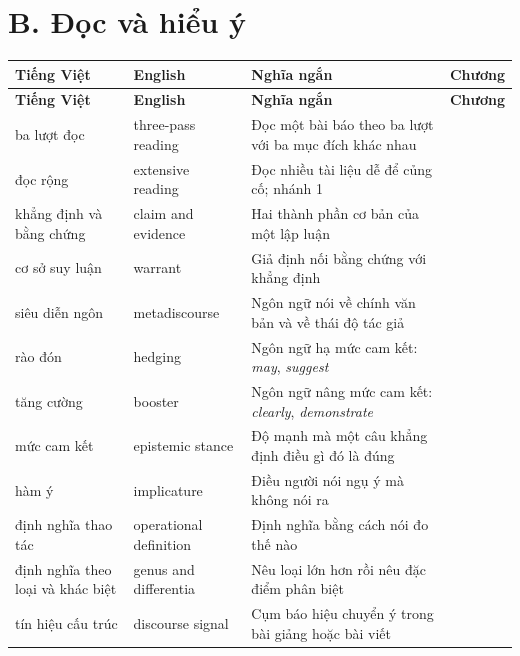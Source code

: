 \documentclass[english.tex]{subfiles}
\begin{document}
\section*{B. Đọc và hiểu ý}
\begin{center}\footnotesize
{}
\begin{longtable}{@{}L{3.4cm}L{3.8cm}L{6.6cm}L{1.5cm}@{}}
\toprule
\textbf{Tiếng Việt} & \textbf{English} & \textbf{Nghĩa ngắn} & \textbf{Chương}\\
\midrule
\endfirsthead
\toprule
\textbf{Tiếng Việt} & \textbf{English} & \textbf{Nghĩa ngắn} & \textbf{Chương}\\
\midrule
\endhead
ba lượt đọc & three-pass reading & Đọc một bài báo theo ba lượt với ba mục đích khác nhau & \\
đọc rộng & extensive reading & Đọc nhiều tài liệu dễ để củng cố; nhánh 1 & \\
khẳng định và bằng chứng & claim and evidence & Hai thành phần cơ bản của một lập luận & \\
cơ sở suy luận & warrant & Giả định nối bằng chứng với khẳng định & \\
siêu diễn ngôn & metadiscourse & Ngôn ngữ nói về chính văn bản và về thái độ tác giả & \\
rào đón & hedging & Ngôn ngữ hạ mức cam kết: \emph{may}, \emph{suggest} & \\
tăng cường & booster & Ngôn ngữ nâng mức cam kết: \emph{clearly}, \emph{demonstrate} & \\
mức cam kết & epistemic stance & Độ mạnh mà một câu khẳng định điều gì đó là đúng & \\
hàm ý & implicature & Điều người nói ngụ ý mà không nói ra & \\
định nghĩa thao tác & operational definition & Định nghĩa bằng cách nói đo thế nào & \\
định nghĩa theo loại và khác biệt & genus and differentia & Nêu loại lớn hơn rồi nêu đặc điểm phân biệt & \\
tín hiệu cấu trúc & discourse signal & Cụm báo hiệu chuyển ý trong bài giảng hoặc bài viết & \\
\bottomrule
\end{longtable}
\end{center}
\end{document}

